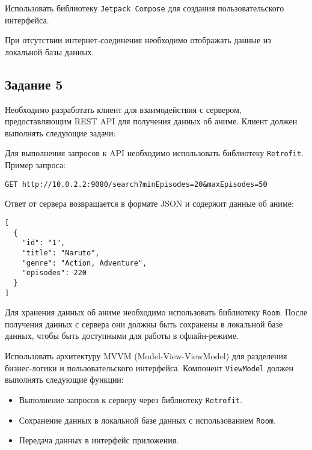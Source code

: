 \documentclass[a4paper,12pt]{article}
\begin{document}
Использовать библиотеку \texttt{Jetpack Compose} для создания пользовательского интерфейса.

При отсутствии интернет-соединения необходимо отображать данные из локальной базы данных.

\subsection*{Задание 5}

Необходимо разработать клиент для взаимодействия с сервером, предоставляющим REST API для получения данных об аниме. Клиент должен выполнять следующие задачи:


Для выполнения запросов к API необходимо использовать библиотеку \texttt{Retrofit}. Пример запроса:

\begin{verbatim}
GET http://10.0.2.2:9080/search?minEpisodes=20&maxEpisodes=50
\end{verbatim}

Ответ от сервера возвращается в формате JSON и содержит данные об аниме:

\begin{verbatim}
[
  {
    "id": "1",
    "title": "Naruto",
    "genre": "Action, Adventure",
    "episodes": 220
  }
]
\end{verbatim}

Для хранения данных об аниме необходимо использовать библиотеку \texttt{Room}. После получения данных с сервера они должны быть сохранены в локальной базе данных, чтобы быть доступными для работы в офлайн-режиме.

Использовать архитектуру MVVM (Model-View-ViewModel) для разделения бизнес-логики и пользовательского интерфейса. Компонент \texttt{ViewModel} должен выполнять следующие функции:
\begin{itemize}
    \item Выполнение запросов к серверу через библиотеку \texttt{Retrofit}.
    \item Сохранение данных в локальной базе данных с использованием \texttt{Room}.
    \item Передача данных в интерфейс приложения.
\end{itemize}
\end{document}
